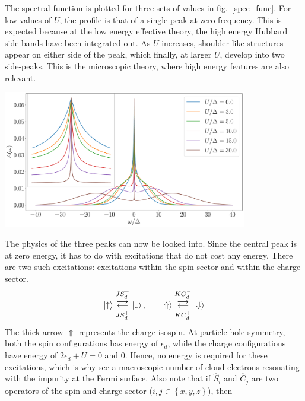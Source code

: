 \documentclass{report}
\numberwithin{equation}{section}
\begin{document}
The spectral function is plotted for three sets of values in fig.~\ref{spec_func}. For low values of \(U\), the profile is that of a single peak at zero frequency. This is expected because at the low energy effective theory, the high energy Hubbard side bands have been integrated out. As \(U\) increases, shoulder-like structures appear on either side of the peak, which finally, at larger \(U\), develop into two side-peaks. This is the microscopic theory, where high energy features are also relevant.
\begin{center}
	\includegraphics[width=0.8\textwidth]{../figures/gen_siam_spec_func.pdf}
	\label{spec_func}
\end{center}
The physics of the three peaks can now be looked into. Since the central peak is at zero energy, it has to do with excitations that do not cost any energy. There are two such excitations: excitations within the spin sector and within the charge sector.
\begin{equation}\begin{aligned}
	\ket{\uparrow} \mathrel{\mathlarger{\mathlarger{\mathop{\rightleftarrows}}^{J S_d^-}_{JS_d^+}}}\ket{\downarrow}, &&&&\ket{\Uparrow} \mathrel{\mathlarger{\mathlarger{\mathop{\rightleftarrows}}^{K C_d^-}_{K C_d^+}}}\ket{\Downarrow}\\
\end{aligned}\end{equation}
The thick arrow \(\Uparrow\) represents the charge isospin. At particle-hole symmetry, both the spin configurations has energy of \(\epsilon_d\), while the charge configurations have energy of \(2\epsilon_d + U=0\) and 0. Hence, no energy is required for these excitations, which is why see a macroscopic number of cloud electrons resonating with the impurity at the Fermi surface. Also note that if \(\hat S_i\) and \(\hat C_j\) are two operators of the spin and charge sector (\(i,j \in \left\{ x,y,z \right\} \)), then
\end{document}
